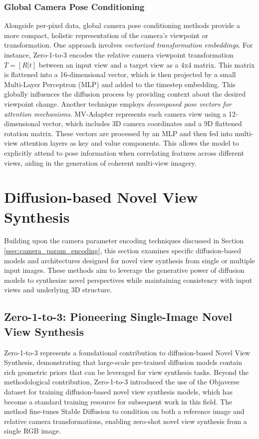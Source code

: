\subsubsection{Global Camera Pose Conditioning}
Alongside per-pixel data, global camera pose conditioning methods provide a more compact, holistic representation of the camera's viewpoint or transformation.
One approach involves \textit{vectorized transformation embeddings}. For instance, Zero-1-to-3 \cite{zero1to3} encodes the relative camera viewpoint transformation \(T = [R|t]\) between an input view and a target view as a 4x4 matrix. This matrix is flattened into a 16-dimensional vector, which is then projected by a small Multi-Layer Perceptron (MLP) and added to the timestep embedding. This globally influences the diffusion process by providing context about the desired viewpoint change.
Another technique employs \textit{decomposed pose vectors for attention mechanisms}. MV-Adapter \cite{mvadapter} represents each camera view using a 12-dimensional vector, which includes 3D camera coordinates and a 9D flattened rotation matrix. These vectors are processed by an MLP and then fed into multi-view attention layers as key and value components. This allows the model to explicitly attend to pose information when correlating features across different views, aiding in the generation of coherent multi-view imagery.

\section{Diffusion-based Novel View Synthesis}\label{sec:novel-view-diffusion}

Building upon the camera parameter encoding techniques discussed in Section \ref{ssec:camera_param_encoding}, this section examines specific diffusion-based models and architectures designed for novel view synthesis from single or multiple input images. These methods aim to leverage the generative power of diffusion models to synthesize novel perspectives while maintaining consistency with input views and underlying 3D structure.

\subsection{Zero-1-to-3: Pioneering Single-Image Novel View Synthesis}

Zero-1-to-3 \cite{zero1to3} represents a foundational contribution to diffusion-based Novel View Synthesis, demonstrating that large-scale pre-trained diffusion models contain rich geometric priors that can be leveraged for view synthesis tasks. Beyond the methodological contribution, Zero-1-to-3 introduced the use of the Objaverse dataset \cite{objaversexl} for training diffusion-based novel view synthesis models, which has become a standard training resource for subsequent work in this field. The method fine-tunes Stable Diffusion to condition on both a reference image and relative camera transformations, enabling zero-shot novel view synthesis from a single RGB image.

